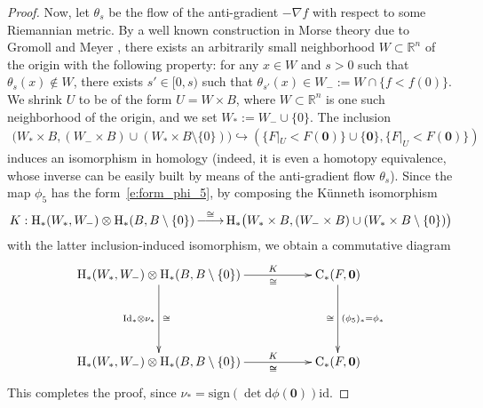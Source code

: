 \documentclass[reqno]{amsart}
\numberwithin{equation}{section}
\theoremstyle{personal}%
\theoremstyle{definition}
\newcommand{\R}{\mathds{R}}
\newcommand{\diff}{\mathrm{d}}
\newcommand{\Hom}{\mathrm{H}}
\newcommand{\Loc}{\mathrm{C}}
\DeclareRobustCommand{\llongrightarrow}{\relbar\joinrel\relbar\joinrel\rightarrow}
\DeclareMathOperator*{\ttoup}{\llongrightarrow}
\begin{document}
\begin{proof}
Now, let $\theta_s$ be the flow of the anti-gradient $-\nabla f$ with respect to some Riemannian metric. By a well known construction in Morse theory due to Gromoll and Meyer  \cite{Gromoll:1969jy}, there exists an arbitrarily small neighborhood $W\subset \R^n$ of the origin with the following property: for any $x\in W$ and $s>0$ such that $\theta_s(x)\not\in W$, there exists $s'\in[0,s)$ such that $\theta_{s'}(x)\in W_-:= W\cap\{f<f(0)\}$. We shrink $U$ to be of the form $U=W\times B$, where $W\subset\R^n$ is one such neighborhood of the origin, and we set $W_*:=W_-\cup\{0\}$. The inclusion
\begin{align*}
\big( W_*\times B,(W_-\times B)\cup (W_*\times B\setminus\{0\})  \big)
\hookrightarrow 
(\{F|_{U}<F(\bm0)\}\cup\{\bm0\},\{F|_{U}<F(\bm0)\})
\end{align*}
induces an isomorphism in homology (indeed, it is even a homotopy equivalence, whose inverse can be easily built by means of the anti-gradient flow $\theta_s$). Since the map $\phi_5$ has the form~\eqref{e:form_phi_5}, by composing the K\"unneth isomorphism
\begin{align*}
K:
\Hom_*(W_*,W_-)\otimes \Hom_*(B,B\setminus\{0\})
\ttoup^{\cong}
\Hom_*\big( W_*\times B,(W_-\times B)\cup (W_*\times B\setminus\{0\})  \big)
\end{align*}
with the latter inclusion-induced isomorphism, we obtain a commutative diagram
\begin{align*}
\xymatrix{
\Hom_*(W_*,W_-)\otimes \Hom_*(B,B\setminus\{0\})
\ar[rr]^{\qquad\qquad K}_{\qquad\qquad\cong}\ar[dd]^{\cong}_{\mathrm{Id_*}\otimes\nu_*}
& &
\Loc_*(F,\bm0)
\ar[dd]^{(\phi_5)_*=\phi_*}_{\cong} 
\\\\
\Hom_*(W_*,W_-)\otimes \Hom_*(B,B\setminus\{0\})
\ar[rr]^{\qquad\qquad K}_{\qquad\qquad\cong}_{\qquad\qquad\cong}
& &
\Loc_*(F,\bm0)
} 
\end{align*}
This completes the proof, since $\nu_*=\mathrm{sign}(\det\diff\phi(\bm0))\mathrm{id}$.
\end{proof}






\end{document}
